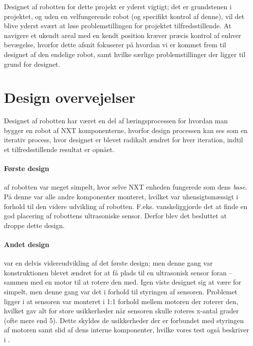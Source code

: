 Designet af robotten for dette projekt er yderst vigtigt; det er grundstenen i projektet, og uden en velfungerende robot (og specifikt kontrol af denne), vil det blive yderst svært at løse problemstillingen for projektet tilfredsstillende.
At navigere et ukendt areal med en kendt position kræver præcis kontrol af enhver bevægelse, hvorfor dette afsnit fokuserer på hvordan vi er kommet frem til designet af den endelige robot, samt hvilke særlige problemstillinger der ligger til grund for designet.

\section{Design overvejelser}
Designet af robotten har været en del af læringsprocessen for hvordan man bygger en robot af \lego NXT komponenterne, hvorfor design processen kan ses som en iterativ process, hvor designet er blevet radikalt ændret for hver iteration, indtil et tilfredsstillende resultat er opnået.



\paragraph{Første design} af robotten var meget simpelt, hvor selve NXT enheden fungerede som dens \textit{base}.
På denne var alle andre komponenter monteret, hvilket var uhensigtsmæssigt i forhold til den videre udvikling af robotten.
F.eks. vanskeliggjorde det at finde en god placering af robottens ultrasoniske sensor.
Derfor blev det besluttet at droppe dette design.

\paragraph{Andet design} var en delvis videreudvikling af det første design; men denne gang var konstruktionen blevet ændret for at få plads til en ultrasonisk sensor foran -- sammen med en motor til at rotere den med.
Igen viste designet sig at være for simpelt, men denne gang var det i forhold til styringen af sensoren.
Problemet ligger i at sensoren var monteret i 1:1 forhold mellem motoren der roterer den, hvilket gav alt for store usikkerheder når sensoren skulle roteres x-antal grader (ofte mere end 5\degree).
Dette skyldes de usikkerheder der er forbundet med styringen af motoren samt slid af dens interne komponenter, hvilke vores test også beskriver i .

